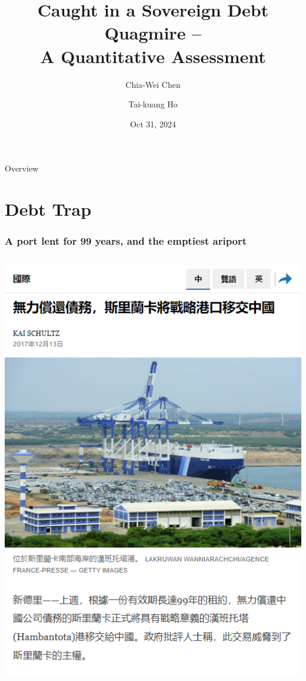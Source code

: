 \documentclass[mathserif]{beamer}
\title{\Large Caught in a Sovereign Debt Quagmire -- \\A Quantitative Assessment}
\author{\small Chia-Wei Chen \and Tai-kuang Ho}
\date{Oct 31, 2024}
\begin{document}
    \begin{frame}

        \maketitle

    \end{frame}

    \begin{frame}{Overview}
        \tableofcontents
    \end{frame}

    \section{Debt Trap}

    \begin{frame}
        \frametitle{A port lent for 99 years, and the emptiest ariport}
        \begin{columns}
            \begin{column}{0.4\textwidth}
                    \includegraphics[width = \textwidth]{fig/Hambontota_news.png}

\end{column}
\end{columns}
\end{frame}
\end{document}
